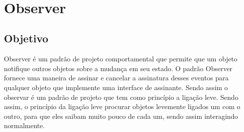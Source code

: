 \documentclass[a4paper]{article}
\begin{document}
\\[0.5cm]
    
    \section{Observer}

    \subsection{Objetivo}

    Observer é um padrão de projeto comportamental que permite que um objeto notifique outros objetos sobre a mudança em seu estado. O padrão Observer fornece uma maneira de assinar e cancelar a assinatura desses eventos para qualquer objeto que implemente uma interface de assinante. Sendo assim o observar é um padrão de projeto que tem como princípio a ligação leve.
	Sendo assim, o princípio da ligação leve procurar objetos levemente ligados um com o outro, para que eles saibam muito pouco de cada um, sendo assim interagindo normalmente.
\end{document}

